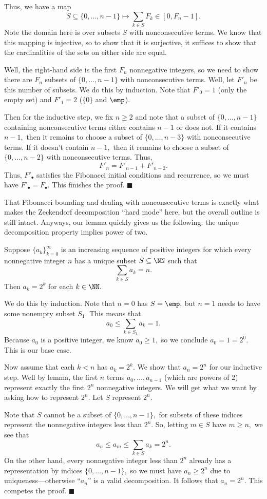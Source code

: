 Thus, we have a map
\[S\subseteq\{0,\ldots,n-1\}\longmapsto\sum_{k\in S}F_k\in[0,F_n-1].\]
Note the domain here is over subsets $S$ with nonconsecutive terms. We know that this mapping is injective, so to show that it is surjective, it suffices to show that the cardinalities of the sets on either side are equal.

Well, the right-hand side is the first $F_n$ nonnegative integers, so we need to show there are $F_n$ subsets of $\{0,\ldots,n-1\}$ with nonconsecutive terms. Well, let $F'_n$ be this number of subsets. We do this by induction. Note that $F'_0=1$ (only the empty set) and $F'_1=2$ ($\{0\}$ and $\emp$).

Then for the inductive step, we fix $n\ge2$ and note that a subset of $\{0,\ldots,n-1\}$ containing nonconsecutive terms either contains $n-1$ or does not. If it contains $n-1,$ then it remains to choose a subset of $\{0,\ldots,n-3\}$ with nonconsecutive terms. If it doesn't contain $n-1,$ then it remains to choose a subset of $\{0,\ldots,n-2\}$ with nonconsecutive terms. Thus,
\[F'_n=F'_{n-1}+F'_{n-2}.\]
Thus, $F'_\bullet$ satisfies the Fibonacci initial conditions and recurrence, so we must have $F'_\bullet=F_\bullet.$ This finishes the proof. $\blacksquare$

That Fibonacci bounding and dealing with nonconsecutive terms is exactly what makes the Zeckendorf decomposition ``hard mode'' here, but the overall outline is still intact. Anyways, our lemma quickly gives us the following: the unique decomposition property implies power of two.
\begin{proposition}
    Suppose $\{a_k\}_{k=0}^\infty$ is an increasing sequence of positive integers for which every nonnegative integer $n$ has a unique subset $S\subseteq\NN$ such that
    \[\sum_{k\in S}a_k=n.\]
    Then $a_k=2^k$ for each $k\in\NN.$
\end{proposition}
We do this by induction. Note that $n=0$ has $S=\emp,$ but $n=1$ needs to have some nonempty subset $S_1.$ This means that
\[a_0\le\sum_{k\in S_1}a_k=1.\]
Because $a_0$ is a positive integer, we know $a_0\ge1,$ so we conclude $a_0=1=2^0.$ This is our base case.

Now assume that each $k<n$ has $a_k=2^k.$ We show that $a_n=2^n$ for our inductive step. Well by lemma, the first $n$ terms $a_0,\ldots,a_{n-1}$ (which are powers of $2$) represent exactly the first $2^n$ nonnegative integers. We will get what we want by asking how to represent $2^n.$ Let $S$ represent $2^n.$

Note that $S$ cannot be a subset of $\{0,\ldots,n-1\},$ for subsets of these indices represent the nonnegative integers less than $2^n.$ So, letting $m\in S$ have $m\ge n,$ we see that
\[a_n\le a_m\le\sum_{k\in S}a_k=2^n.\]
On the other hand, every nonnegative integer less than $2^n$ already has a representation by indices $\{0,\ldots,n-1\},$ so we must have $a_n\ge2^n$ due to uniqueness---otherwise ``$a_n$'' is a valid decomposition. It follows that $a_n=2^n.$ This competes the proof. $\blacksquare$

